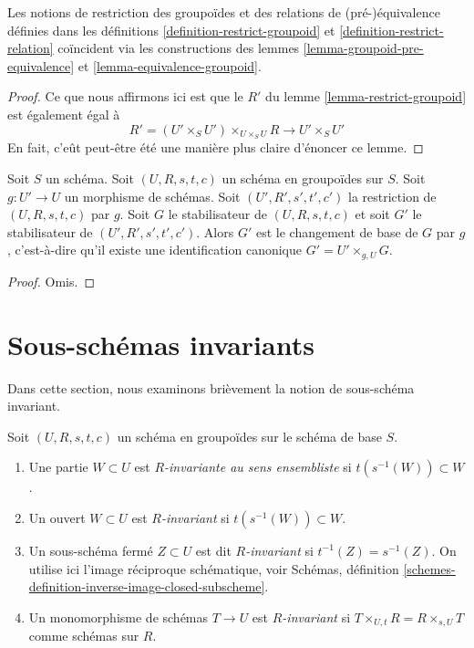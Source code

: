 \begin{lemma}
\label{lemma-restrict-groupoid-relation}
Les notions de restriction des groupoïdes et des
relations de (pré-)équivalence définies dans les définitions
\ref{definition-restrict-groupoid} et \ref{definition-restrict-relation}
coïncident via les constructions des
lemmes \ref{lemma-groupoid-pre-equivalence} et
\ref{lemma-equivalence-groupoid}.
\end{lemma}

\begin{proof}
Ce que nous affirmons ici est que le $R'$ du
lemme \ref{lemma-restrict-groupoid} est également
égal à
$$
R' = (U' \times_S U')\times_{U \times_S U} R
\longrightarrow
U' \times_S U'
$$
En fait, c'eût peut-être été une manière plus claire d'énoncer ce lemme.
\end{proof}

\begin{lemma}
\label{lemma-restrict-stabilizer}
Soit $S$ un schéma.
Soit $(U, R, s, t, c)$ un schéma en groupoïdes sur $S$.
Soit $g : U' \to U$ un morphisme de schémas.
Soit $(U', R', s', t', c')$ la restriction de $(U, R, s, t, c)$ par $g$.
Soit $G$ le stabilisateur de $(U, R, s, t, c)$ et soit
$G'$ le stabilisateur de $(U', R', s', t', c')$.
Alors $G'$ est le changement de base de $G$ par $g$, c'est-à-dire
qu'il existe une identification canonique $G' = U' \times_{g, U} G$.
\end{lemma}

\begin{proof}
Omis.
\end{proof}






\section{Sous-schémas invariants}
\label{section-invariant}

\noindent
Dans cette section, nous examinons brièvement la notion de sous-schéma invariant.

\begin{definition}
\label{definition-invariant-open}
Soit $(U, R, s, t, c)$ un schéma en groupoïdes sur le schéma de base $S$.
\begin{enumerate}
\item Une partie $W \subset U$ est {\it $R$-invariante au sens ensembliste}
si $t(s^{-1}(W)) \subset W$.
\item Un ouvert $W \subset U$ est {\it $R$-invariant} si
$t(s^{-1}(W)) \subset W$.
\item Un sous-schéma fermé $Z \subset U$ est dit {\it $R$-invariant}
si $t^{-1}(Z) = s^{-1}(Z)$. On utilise ici l'image réciproque schématique, voir
Schémas, définition \ref{schemes-definition-inverse-image-closed-subscheme}.
\item Un monomorphisme de schémas $T \to U$ est {\it $R$-invariant} si
$T \times_{U, t} R = R \times_{s, U} T$ comme schémas sur $R$.
\end{enumerate}
\end{definition}

